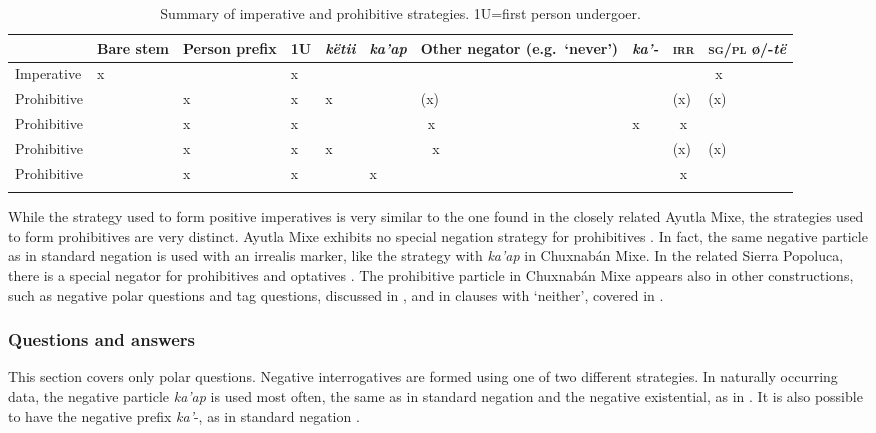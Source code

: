 \documentclass[output=paper,colorlinks,citecolor=brown,draft]{langscibook}
\begin{document}
\begin{table}\small
\begin{tabularx}{\textwidth}{lQQlllQllQ}
\lsptoprule
& {Bare stem} & {Person prefix} & 1U & \textit{këtii} & \textit{ka’ap} & {Other \mbox{negator} \mbox{(e.g. ‘never’)}} & \textit{ka’-} & {\scshape irr} & {\scshape sg/pl} ø/-\textit{të}\\
\midrule 
{Imperative} & {x} & & {x} & & & & & & ~{x}\\
{Prohibitive} & & {x} & {x} & {x} & & {(x)} & & {(x)} & {(x)}\\
{Prohibitive} & & {x} & {x} & & & ~{x} & {x} & ~{x} & \\
{Prohibitive} & & {x} & {x} & {x} & & ~ {x} & & {(x)} & {(x)}\\
{Prohibitive} & & {x} & {x} & & {x} & & & ~{x} & \\
\lspbottomrule
\end{tabularx}
\caption{Summary of imperative and prohibitive strategies. 1U=first person undergoer.}
\label{tab:mix:4}
\end{table}


While the strategy used to form positive imperatives is very similar to the one found in the closely related Ayutla Mixe, the strategies used to form prohibitives are very distinct. Ayutla Mixe exhibits no special negation strategy for prohibitives \citep[307]{Romero-Méndez2009}. In fact, the same negative particle as in standard negation is used with an irrealis marker, like the strategy with \textit{ka’ap} in Chuxnabán Mixe. In the related Sierra Popoluca, there is a special negator for prohibitives and optatives \citep{Boudreault2018}. The prohibitive particle in Chuxnabán Mixe appears also in other constructions, such as negative polar questions and tag questions, discussed in , and in clauses with ‘neither’, covered in .

\subsubsection{Questions and answers}\label{sec:mix:2.2.2}

This section covers only polar questions. Negative interrogatives are formed using one of two different strategies. In naturally occurring data, the negative particle \textit{ka’ap} is used most often, the same as in standard negation and the negative existential, as in . It is also possible to have the negative prefix \textit{ka’}{}-, as in standard negation .
\end{document}
